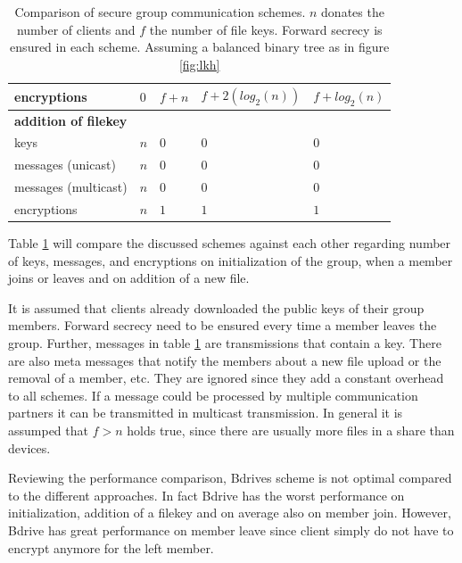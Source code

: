 \begin{table}[!ht]
\begin{tabular}{l 		| l 						| l 							| l 						| l 						}
encryptions 			& $0$						& $f + n$ 						& $f + 2 (log_2(n))$ 		& $f + log_2(n)$	 		\\ %
\hline	
\textbf{addition of filekey}																																\\
keys 					& $n$		 				& $0$							& $0$	 					& $0$		 				\\ %
messages (unicast)		& $n$		 				& $0$	 						& $0$ 						& $0$		 				\\ %
messages (multicast)	& $n$ 						& $0$ 							& $0$ 						& $0$	 					\\ %
encryptions				& $n$ 						& $1$ 							& $1$ 						& $1$		 				\\ %
\hline
\end{tabular}
\caption{Comparison of secure group communication schemes. $n$ donates the number of clients and $f$ the number of file keys. Forward secrecy is ensured in each scheme. Assuming a balanced binary tree as in figure \ref{fig:lkh}}
\label{tab:comparisons}
\end{table}

Table \ref{tab:comparisons} will compare the discussed schemes against each other regarding number of keys, messages, and encryptions on initialization of the group, when a member joins or leaves and on addition of a new file. 

It is assumed that clients already downloaded the public keys of their group members. Forward secrecy need to be ensured every time a member leaves the group.
Further, messages in table \ref{tab:comparisons} are transmissions that contain a key. There are also meta messages that notify the members about a new file upload or the removal of a member, etc.  They are ignored since they add a constant overhead to all schemes.  If a message could be processed by multiple communication partners it can be transmitted in multicast transmission. In general it is assumped that $f > n$ holds true, since there are usually more files in a share than devices.

Reviewing the performance comparison, Bdrives scheme is not optimal compared to the different approaches. In fact Bdrive has the worst performance on initialization, addition of a filekey and on average also on member join. However, Bdrive has great performance on member leave since client simply do not have to encrypt anymore for the left member.

